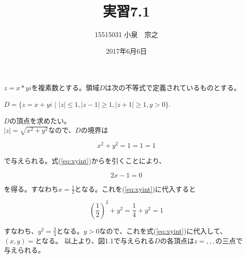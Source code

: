 \documentclass[12pt,a4j]{jarticle}
\title{実習7.1}
\author{15515031 小泉　宗之}
\date{2017年6月6日}
\begin{document}
\maketitle
$z=x*yi$を複素数とする。領域$D$は次の不等式で定義されているものとする。
\begin{center}
		$D = \{z = x + yi$ \smallskip $|$ \smallskip $|z| \leq 1, |z-1|\geq 1,|z+1|\geq 1, y>0 \}.$
\end{center}
$D$の頂点を求めたい。
\\
$|z|=\sqrt{x^2+y^2}$なので、$D$の境界は
\begin{center}
\begin{equation}
x^2+y^2　=1\label{eq:xyint}
=1
=1
\end{equation}
\end{center}
で与えられる。式(\ref{eq:xyint})からを引くことにより、
\begin{center}
\[
2x-1=0
\]
\end{center}
を得る。すなわち$x=\frac{1}{2}$となる。これを(\ref{eq:xyint})に代入すると
\begin{center}
\[
(\frac{1}{2})^2+y^2=\frac{1}{4}+y^2=1
\]
\end{center}
すなわち、$y^2=\frac{3}{4}$となる。$y>0$なので、これを式(\ref{eq:xyint})に代入して、$(x,y)=$となる。
以上より、図1.1で与えられる$D$の各頂点は$z=,,,$の三点で与えられる。
\end{document}
